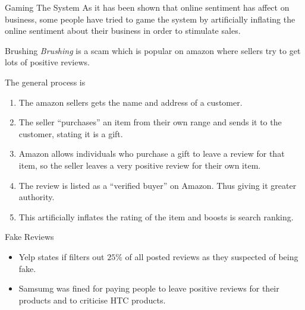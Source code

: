 \documentclass[11pt,a4paper]{article}
\begin{document}
  \begin{proposition}{Gaming The System}
    As it has been shown that online sentiment has affect on business, some people have tried to game the system by artificially inflating the online sentiment about their business in order to stimulate sales.
  \end{proposition}

  \begin{definition}{Brushing}
    \textit{Brushing} is a scam which is popular on amazon where sellers try to get lots of positive reviews.
    \par The general process is
    \begin{enumerate}
      \item The amazon sellers gets the name and address of a customer.
      \item The seller ``purchases'' an item from their own range and sends it to the customer, stating it is a gift.
      \item Amazon allows individuals who purchase a gift to leave a review for that item, so the seller leaves a very positive review for their own item.
      \item The review is listed as a ``verified buyer'' on Amazon. Thus giving it greater authority.
      \item This artificially inflates the rating of the item and boosts is search ranking.
    \end{enumerate}
  \end{definition}

  \begin{remark}{Fake Reviews}
    \begin{itemize}
      \item Yelp states if filters out $25\%$ of  all posted reviews as they suspected of being fake.
      \item Samsumg was fined for paying people to leave positive reviews for their products and to criticise HTC products.
    \end{itemize}
  \end{remark}
\end{document}
